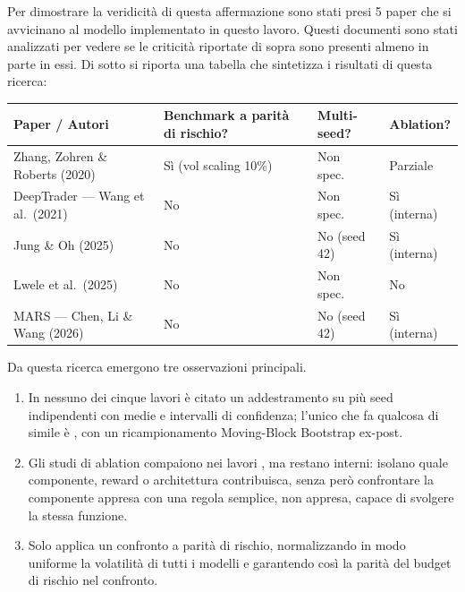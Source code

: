 Per dimostrare la veridicità di questa affermazione sono stati presi 5 paper che si avvicinano al modello implementato in questo lavoro.
Questi documenti sono stati analizzati per vedere se le criticità riportate di sopra sono presenti almeno in parte in essi.
Di sotto si riporta una tabella che sintetizza i risultati di questa ricerca:



\begin{table}[H]
\centering
\small
\renewcommand{\arraystretch}{1.4}
\label{tab:sota-critica-affini}
\begin{tabular}{>{\raggedright\arraybackslash}p{4.3cm} >{\raggedright\arraybackslash}p{2.4cm} >{\raggedright\arraybackslash}p{2.3cm} >{\raggedright\arraybackslash}p{2.4cm}}
\toprule
\textbf{Paper / Autori} & \textbf{Benchmark a parità di rischio?} & \textbf{Multi-seed?} & \textbf{Ablation?} \\
\midrule
Zhang, Zohren \& Roberts (2020) & Sì (vol scaling 10\%) & Non spec.\ & Parziale \\
DeepTrader --- Wang et al.\ (2021) & No & Non spec.\ & Sì (interna) \\
Jung \& Oh (2025) & No & No (seed 42) & Sì (interna) \\
Lwele et al.\ (2025) & No & Non spec.\ & No \\
MARS --- Chen, Li \& Wang (2026) & No & No (seed 42) & Sì (interna) \\
\bottomrule
\end{tabular}
\end{table}

Da questa ricerca emergono tre osservazioni principali.
\begin{enumerate}
    \item In nessuno dei cinque lavori è citato un addestramento su più seed
    indipendenti con medie e intervalli di confidenza; l'unico che fa qualcosa di
    simile è \citet{jung2025factor}, con un ricampionamento Moving-Block Bootstrap
    ex-post.
    \item Gli studi di ablation compaiono nei lavori
    \citep{wang2021deeptrader, jung2025factor, chen2026mars}, ma restano interni:
    isolano quale componente, reward o architettura contribuisca, senza però
    confrontare la componente appresa con una regola semplice, non appresa, capace
    di svolgere la stessa funzione.
    \item Solo \citet{zhang2020deeplearning} applica un confronto a parità di
    rischio, normalizzando in modo uniforme la volatilità di tutti i modelli e
    garantendo così la parità del budget di rischio nel confronto.
\end{enumerate}


